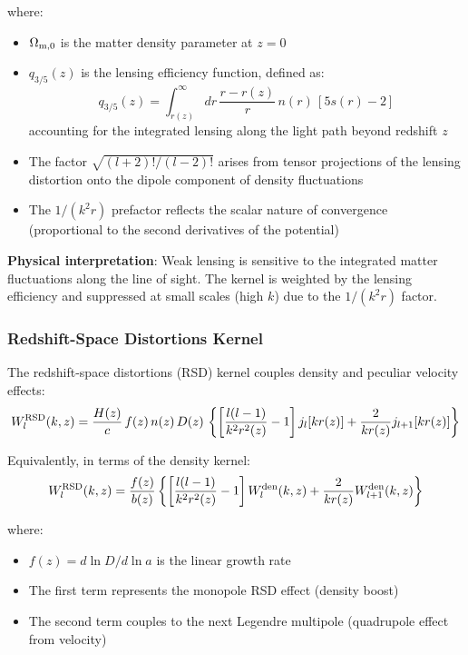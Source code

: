 where:
\begin{itemize}
  \item $\Omega_{{\rm m},0}$ is the matter density parameter at $z=0$
  \item $q_{3/5}(z)$ is the lensing efficiency function, defined as:
  \begin{equation}
  q_{3/5}(z) = \int_{r(z)}^\infty d r \, \frac{r - r(z)}{r} \, n(r) \, [5 s(r) - 2]
  \end{equation}
  accounting for the integrated lensing along the light path beyond redshift $z$
  \item The factor $\sqrt{(l+2)!/(l-2)!}$ arises from tensor projections of the lensing distortion onto the dipole component of density fluctuations
  \item The $1/(k^2 r)$ prefactor reflects the scalar nature of convergence (proportional to the second derivatives of the potential)
\end{itemize}

\textbf{Physical interpretation}: Weak lensing is sensitive to the integrated matter fluctuations along the line of sight. The kernel is weighted by the lensing efficiency and suppressed at small scales (high $k$) due to the $1/(k^2 r)$ factor.

\subsubsection{Redshift-Space Distortions Kernel}

The redshift-space distortions (RSD) kernel couples density and peculiar velocity effects:
\begin{equation}
\label{eq:kernel_rsd}
W^{\rm RSD}_l(k,z) = \frac{H(z)}{c} \, f(z) \, n(z) \, D(z) \, \left\{ \left[\frac{l(l-1)}{k^2 r^2(z)} - 1\right] j_l[k r(z)] + \frac{2}{k r(z)} j_{l+1}[k r(z)] \right\}
\end{equation}

Equivalently, in terms of the density kernel:
\begin{equation}
\label{eq:kernel_rsd_alt}
W^{\rm RSD}_l(k,z) = \frac{f(z)}{b(z)} \left\{ \left[\frac{l(l-1)}{k^2 r^2(z)} - 1\right] W^{\rm den}_l(k,z) + \frac{2}{k r(z)} W^{\rm den}_{l+1}(k,z) \right\}
\end{equation}

where:
\begin{itemize}
  \item $f(z) = d \ln D / d \ln a$ is the linear growth rate
  \item The first term represents the monopole RSD effect (density boost)
  \item The second term couples to the next Legendre multipole (quadrupole effect from velocity)
\end{itemize}

